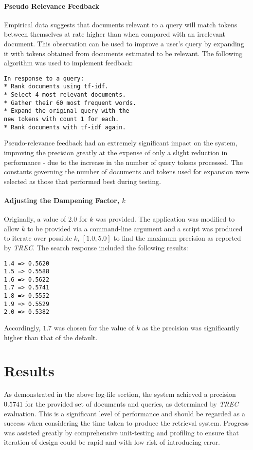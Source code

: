 \documentclass[10pt, a4paper, twocolumn]{article}   	%
\begin{document}
\paragraph{Pseudo Relevance Feedback}
Empirical data suggests that documents relevant to a query will match tokens between themselves at rate higher than when compared with an irrelevant document. This observation can be used to improve a user's query by expanding it with tokens obtained from documents estimated to be relevant.
The following algorithm was used to implement feedback:
\begin{verbatim}
In response to a query:
* Rank documents using tf-idf.
* Select 4 most relevant documents.
* Gather their 60 most frequent words.
* Expand the original query with the
new tokens with count 1 for each.
* Rank documents with tf-idf again.
\end{verbatim}
Pseudo-relevance feedback had an extremely significant impact on the system, improving the precision greatly at the expense of only a slight reduction in performance - due to the increase in the number of query tokens processed. The constants governing the number of documents and tokens used for expansion were selected as those that performed best during testing.

\paragraph{Adjusting the Dampening Factor, $k$}
Originally, a value of $2.0$ for $k$ was provided. The application was modified to allow $k$ to be provided via a command-line argument and a script was produced to iterate over possible $k$, $[1.0, 5.0]$ to find the maximum precision \textendash{} as reported by \emph{TREC}.
The search response included the following results:
\begin{verbatim}
1.4 => 0.5620
1.5 => 0.5588
1.6 => 0.5622
1.7 => 0.5741
1.8 => 0.5552
1.9 => 0.5529
2.0 => 0.5382
\end{verbatim}
Accordingly, $1.7$ was chosen for the value of $k$ as the precision was significantly higher than that of the default.
\section{Results}
As demonstrated in the above log-file section, the system achieved a precision $0.5741$ for the provided set of documents and queries, as determined by \emph{TREC} evaluation.
This is a significant level of performance and should be regarded as a success when considering the time taken to produce the retrieval system. Progress was assisted greatly by comprehensive unit-testing and profiling to ensure that iteration of design could be rapid and with low risk of introducing error.
\end{document}
